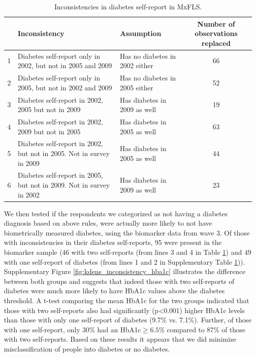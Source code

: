 \documentclass[12pt,english]{article}
\begin{document}
\begin{table}[!ht]
	\caption{\label{tab:Inconsistencies}Inconsistencies in diabetes self-report in MxFLS.}
	\begin{center}
		\begin{adjustbox}{max width=\linewidth} 
			\begin{tabular}{lllc}
				\hline 
				&Inconsistency  & Assumption  & Number of observations replaced\tabularnewline
				\hline 
				1 &Diabetes self-report only in 2002, but not in 2005 and 2009  & Has no diabetes in 2002 either  & 66\tabularnewline
				2 &Diabetes self-report only in 2005, but not in 2002 and 2009  & Has no diabetes in 2005 either  & 52\tabularnewline
				3 &Diabetes self-report in 2002, 2005 but not in 2009  & Has diabetes in 2009 as well  & 19\tabularnewline
				4 &Diabetes self-report in 2002, 2009 but not in 2005  & Has diabetes in 2005 as well  & 63\tabularnewline
				5 &Diabetes self-report in 2002, but not in 2005. Not in survey in 2009  & Has diabetes in 2005 as well  & 44\tabularnewline
				6 &Diabetes self-report in 2005, but not in 2009. Not in survey in 2002  & Has diabetes in 2009 as well  & 23\tabularnewline
				\hline 
			\end{tabular}
		\end{adjustbox}
	\end{center}
\end{table}

We then tested if the respondents we categorized as not having a diabetes diagnosis based on above rules, were actually more likely to not have biometrically measured diabetes, using the biomarker data from wave 3. Of those with inconsistencies in their diabetes self-reports, 95 were present in the biomarker sample (46 with two self-reports (from lines 3 and 4 in Table \ref{tab:Inconsistencies}) and 49 with one self-report of diabetes (from lines 1 and 2 in Supplementary Table \ref{tab:Inconsistencies})). Supplementary Figure \ref{fig:kdens_inconsistency_hba1c} illustrates the difference between both groups and suggests that indeed those with two self-reports of diabetes were much more likely to have \ac{HbA1c} values above the diabetes threshold. A t-test comparing the mean \ac{HbA1c} for the two groups indicated that those with two self-reports also had significantly (p<0.001) higher \ac{HbA1c} levels than those with only one self-report of diabetes (9.7\% vs. 7.1\%). Further, of those with one self-report,  only 30\% had an \ac{HbA1c}$\geq6.5$\% compared to 87\% of those with two self-reports. Based on these results it appears that we did minimize misclassification of people into diabetes or no diabetes. 
\end{document}
